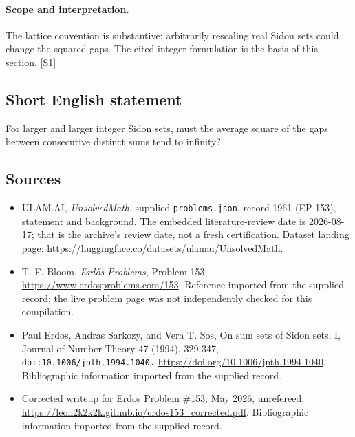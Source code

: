\documentclass[11pt,a4paper]{article}
\newcommand{\sref}[2]{\hyperlink{source:#1:#2}{[S#2]}}
\begin{document}
\paragraph{Scope and interpretation.}

The lattice convention is substantive: arbitrarily rescaling real Sidon sets could change the squared gaps. The cited integer formulation is the basis of this section. \sref{1961}{1}

\subsection{Short English statement}

For larger and larger integer Sidon sets, must the average square of the gaps between consecutive distinct sums tend to infinity?

\subsection{Sources}

{\small

\begin{itemize}

\item[\hypertarget{source:1961:1}{S1}] ULAM.AI, \emph{UnsolvedMath}, supplied \texttt{problems.json}, record 1961 (EP-153), statement and background. The embedded literature-review date is 2026-08-17; that is the archive’s review date, not a fresh certification. Dataset landing page: \url{https://huggingface.co/datasets/ulamai/UnsolvedMath}.

\item[\hypertarget{source:1961:2}{S2}] T. F. Bloom, \emph{Erdős Problems}, Problem 153, \url{https://www.erdosproblems.com/153}. Reference imported from the supplied record; the live problem page was not independently checked for this compilation.

\item[\hypertarget{source:1961:3}{S3}] Paul Erdos, Andras Sarkozy, and Vera T. Sos, On sum sets of Sidon sets, I, Journal of Number Theory 47 (1994), 329-347, \nolinkurl{doi:10.1006/jnth.1994.1040.} \url{https://doi.org/10.1006/jnth.1994.1040}. Bibliographic information imported from the supplied record.

\item[\hypertarget{source:1961:4}{S4}] Corrected writeup for Erdos Problem \#153, May 2026, unrefereed. \url{https://leon2k2k2k.github.io/erdos153_corrected.pdf}. Bibliographic information imported from the supplied record.

\end{itemize}

}

\label{end:1961}
\end{document}
